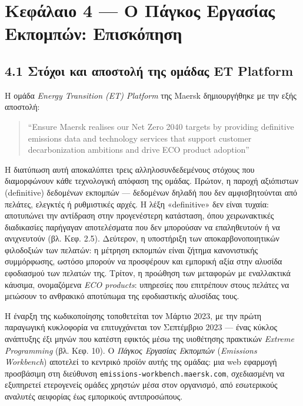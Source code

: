 \pagebreak

\chapter{Κεφάλαιο 4 --- Ο Πάγκος Εργασίας Εκπομπών:
Επισκόπηση}\label{ux3baux3b5ux3c6ux3acux3bbux3b1ux3b9ux3bf-4-ux3bf-ux3c0ux3acux3b3ux3baux3bfux3c2-ux3b5ux3c1ux3b3ux3b1ux3c3ux3afux3b1ux3c2-ux3b5ux3baux3c0ux3bfux3bcux3c0ux3ceux3bd-ux3b5ux3c0ux3b9ux3c3ux3baux3ccux3c0ux3b7ux3c3ux3b7}

\section{4.1 Στόχοι και αποστολή της ομάδας ET
Platform}\label{ux3c3ux3c4ux3ccux3c7ux3bfux3b9-ux3baux3b1ux3b9-ux3b1ux3c0ux3bfux3c3ux3c4ux3bfux3bbux3ae-ux3c4ux3b7ux3c2-ux3bfux3bcux3acux3b4ux3b1ux3c2-et-platform}

Η ομάδα \emph{Energy Transition (ET) Platform} της Maersk δημιουργήθηκε
με την εξής αποστολή:

\begin{quote}
``Ensure Maersk realises our Net Zero 2040 targets by providing
definitive emissions data and technology services that support customer
decarbonization ambitions and drive ECO product adoption''
\end{quote}

Η διατύπωση αυτή αποκαλύπτει τρεις αλληλοσυνδεδεμένους στόχους που
διαμορφώνουν κάθε τεχνολογική απόφαση της ομάδας. Πρώτον, η παροχή
αξιόπιστων (definitive) δεδομένων εκπομπών --- δεδομένων δηλαδή που δεν
αμφισβητούνται από πελάτες, ελεγκτές ή ρυθμιστικές αρχές. Η λέξη
«definitive» δεν είναι τυχαία: αποτυπώνει την αντίδραση στην
προγενέστερη κατάσταση, όπου χειρωνακτικές διαδικασίες παρήγαγαν
αποτελέσματα που δεν μπορούσαν να επαληθευτούν ή να ανιχνευτούν (βλ.
Κεφ. 2.5). Δεύτερον, η υποστήριξη των αποκαρβονοποιητικών φιλοδοξιών των
πελατών: η μέτρηση εκπομπών είναι ζήτημα κανονιστικής συμμόρφωσης,
ωστόσο μπορούν να προσφέρουν και εμπορική αξία στην αλυσίδα εφοδιασμού
των πελατών της. Τρίτον, η προώθηση των μεταφορών με εναλλακτικά
κάυσιμα, ονομαζόμενα \emph{ECO products}: υπηρεσίες που επιτρέπουν στους
πελάτες να μειώσουν το ανθρακικό αποτύπωμα της εφοδιαστικής αλυσίδας
τους.

Η έναρξη της κωδικοποίησης τοποθετείται τον Μάρτιο 2023, με την πρώτη
παραγωγική κυκλοφορία να επιτυγχάνεται τον Σεπτέμβριο 2023 --- ένας
κύκλος ανάπτυξης έξι μηνών που κατέστη εφικτός μέσω της υιοθέτησης
πρακτικών \emph{Extreme Programming} (βλ. Κεφ. 10). Ο \emph{Πάγκος
Εργασίας Εκπομπών} (\emph{Emissions Workbench}) αποτελεί το κεντρικό
προϊόν αυτής της ομάδας: μια web εφαρμογή προσβάσιμη στη διεύθυνση
\texttt{emissions-workbench.maersk.com}, σχεδιασμένη να εξυπηρετεί
ετερογενείς ομάδες χρηστών μέσα στον οργανισμό, από εσωτερικούς αναλυτές
αειφορίας έως εμπορικούς αντιπροσώπους.

